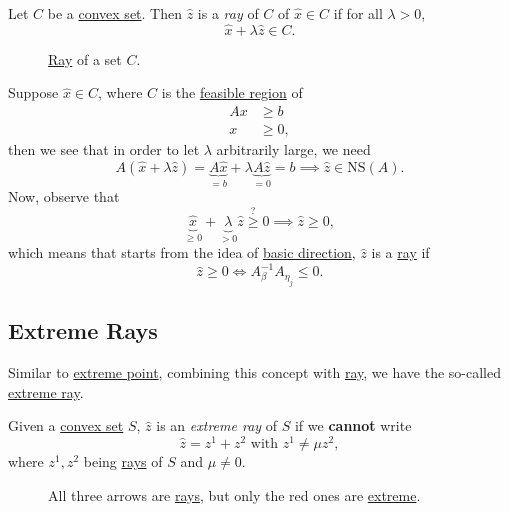 \begin{definition}[Ray]\label{def:ray}
	Let \(C\) be a \hyperref[def:convex-set]{convex set}. Then \(\hat{z}\) is a \emph{ray} of \(C\) of \(\hat{x}\in C\) if for all \(\lambda > 0\),
	\[
		\hat{x} + \lambda \hat{z} \in C.
	\]
\end{definition}

\begin{figure}[H]
	\centering
	\caption{\hyperref[def:ray]{Ray} of a set \(C\).}
	\label{fig:ray}
\end{figure}

Suppose \(\hat{x}\in C\), where \(C\) is the \hyperref[def:feasible-region]{feasible region} of
\[
	\begin{aligned}
		Ax & \geq b  \\
		x  & \geq 0,
	\end{aligned}
\]
then we see that in order to let \(\lambda\) arbitrarily large, we need
\[
	A(\hat{x} + \lambda \hat{z}) = \underbrace{A \hat{x}}_{=b} + \lambda \underbrace{A \hat{z}}_{=0} = b\implies \hat{z} \in \mathrm{NS}(A).
\]
Now, observe that
\[
	\underbrace{\hat{x}}_{\geq 0} + \underbrace{\lambda}_{>0} \hat{z} \overset{?}{\geq} 0 \implies \hat{z} \geq 0,
\]
which means that starts from the idea of \hyperref[def:basic-direction]{basic direction}, \(\hat{z}\) is a \hyperref[def:ray]{ray} if
\[
	\hat{z} \geq 0 \iff A^{-1}_{\beta}A_{\eta_j} \leq 0.
\]

\subsection{Extreme Rays}
Similar to \hyperref[def:extreme-point]{extreme point}, combining this concept with \hyperref[def:ray]{ray}, we have the so-called \hyperref[def:extreme-ray]{extreme ray}.

\begin{definition}\label{def:extreme-ray}
	Given a \hyperref[def:convex-set]{convex set} \(S\), \(\hat{z}\) is an \emph{extreme ray} of \(S\) if we \textbf{cannot} write
	\[
		\hat{z} = z^1 + z^2 \text{ with }z^1 \neq \mu z^2,
	\]
	where \(z^1, z^2\) being \hyperref[def:ray]{rays} of \(S\) and \(\mu\neq 0\).
\end{definition}

\begin{figure}[H]
	\centering
	\caption{All three arrows are \hyperref[def:ray]{rays}, but only the red ones are \hyperref[def:extreme-ray]{extreme}.}
	\label{fig:extreme-ray}
\end{figure}

